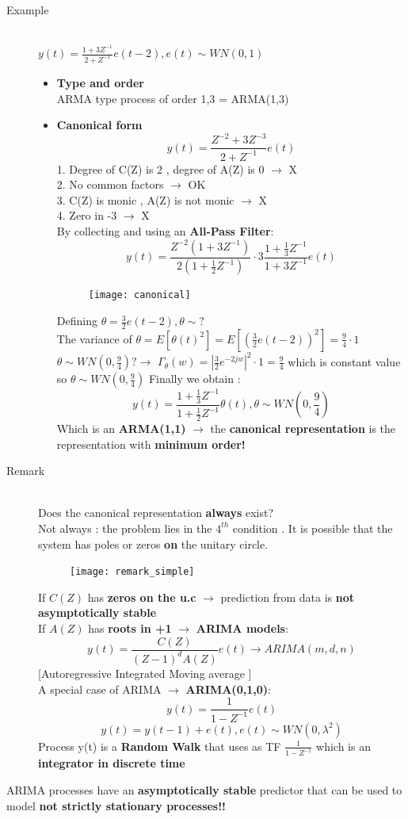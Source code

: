 \begin{description}
\item[Example]\hfill\\
$ y(t) = \frac{1+3Z^{-1}}{2+Z^{-1}}e(t-2) , e(t) \sim WN(0,1)$
\begin{itemize}
\item \textbf{Type and order}\\
ARMA type process of order 1,3 = ARMA(1,3)
\item \textbf{Canonical form}\\
$$ y(t) = \frac{Z^{-2} + 3Z^{-3}}{2+Z^{-1}} e(t)$$
1. Degree of C(Z) is 2 , degree of A(Z) is 0 $\to$ X\\
2. No common factors $\to$ OK\\
3. C(Z) is monic , A(Z) is not monic $\to$ X\\
4. Zero in -3 $\to$ X \\
By collecting  and using an \textbf{All-Pass Filter}:
$$ y(t) =  \frac{Z^{-2}(1+3Z^{-1})}{2(1+\frac{1}{2}Z^{-1})} \cdot 3 \frac{1+\frac{1}{3}Z^{-1}}{1+3Z^{-1}}e(t)$$ 
\begin{figure}[H]
 \centering
  \texttt{[image: canonical]}
\end{figure}
Defining $\theta = \frac{3}{2}e(t-2) , \theta \sim ? $\\
The variance of $\theta = E[\theta(t)^2]= E[(\frac{3}{2}e(t-2))^2] = \frac{9}{4}\cdot 1$\\
$\theta \sim WN(0,\frac{9}{4}) ? \to$ $ \Gamma_\theta(w)= |\frac{3}{2}e^{-2jw}|^2 \cdot 1 = \frac{9}{4} $ which is constant value so $\theta \sim WN(0,\frac{9}{4})$
Finally we obtain : 
\[
\boxed{y(t) =\frac{1+\frac{1}{3}Z^{-1}}{1+\frac{1}{2}Z^{-1}}\theta(t) , \theta \sim WN(0,\frac{9}{4})}
\]
Which is an \textbf{ARMA(1,1)} $\to$ the \textbf{canonical representation} is the representation with \textbf{minimum order!}
\end{itemize}

\item[Remark]\hfill\\
Does the canonical representation \textbf{always} exist?\\
Not always :  the problem lies in the $4^{th}$ condition . It is possible that the system has poles or zeros \textbf{on} the unitary circle.
\begin{figure}[H]
 \centering
  \texttt{[image: remark\_simple]}
\end{figure}
If $C(Z)$ has \textbf{zeros on the u.c} $\to$ prediction from data is \textbf{not asymptotically stable}\\
If $A(Z)$ has \textbf{roots in +1} $\to$ \textbf{ARIMA models}:
\[
\boxed{y(t) = \frac{C(Z)}{(Z-1)^dA(Z)}e(t) \to ARIMA(m,d,n)}
\]
[Autoregressive Integrated Moving average ]\\
A special case of ARIMA $\to$ \textbf{ARIMA(0,1,0)}:
\[
\boxed{y(t) = \frac{1}{1-Z^{-1}}e(t)}
\]
\[
\boxed{y(t) =y(t-1) +e(t) , e(t) \sim WN(0,\lambda^2)}
\]
Process y(t) is a \textbf{Random Walk} that uses as TF $\frac{1}{1-Z^{-1}}$ which is an \textbf{integrator in discrete time}
\end{description}
ARIMA processes have an \textbf{asymptotically stable} predictor that can be used to model \textbf{not strictly stationary processes!!}

